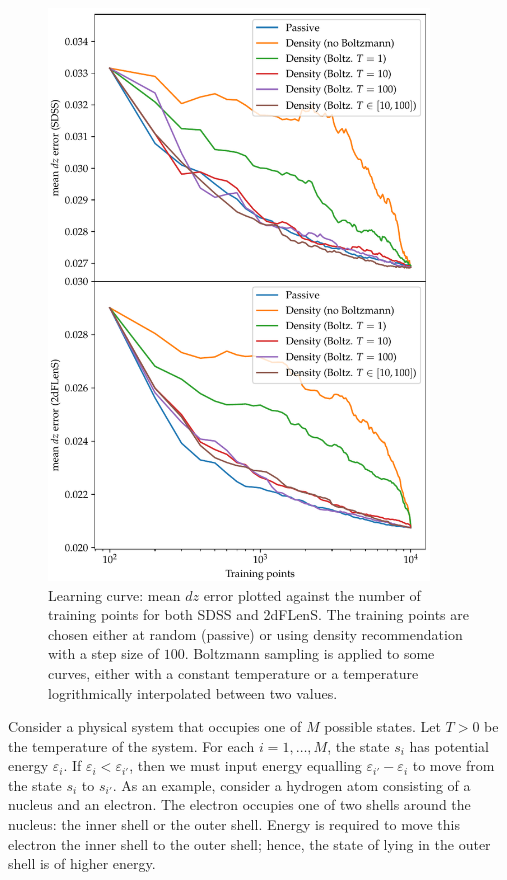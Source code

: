 \documentclass[11pt,twoside,openright]{report}
\begin{document}
  \begin{figure}
    \centering
    \includegraphics[width=0.9\textwidth]{boltz_density_dz1.pdf}
    \caption{Learning curve: mean $dz$ error plotted against the number of training points for both SDSS and 2dFLenS. The training points are chosen either at random (passive) or using density recommendation with a step size of $100$. Boltzmann sampling is applied to some curves, either with a constant temperature or a temperature logrithmically interpolated between two values.}
    \label{fig:boltz_density_dz1}
  \end{figure}

Consider a physical system that occupies one of $M$ possible states. Let $T > 0$ be the temperature of the system. For each $i=1, \dots, M$, the state $s_i$ has potential energy $\varepsilon_i$. If $\varepsilon_i < \varepsilon_{i'}$, then we must input energy equalling $\varepsilon_{i'} - \varepsilon_i$ to move from the state $s_i$ to $s_{i'}$. As an example, consider a hydrogen atom consisting of a nucleus and an electron. The electron occupies one of two shells around the nucleus: the inner shell or the outer shell. Energy is required to move this electron the inner shell to the outer shell; hence, the state of lying in the outer shell is of higher energy.
\end{document}
